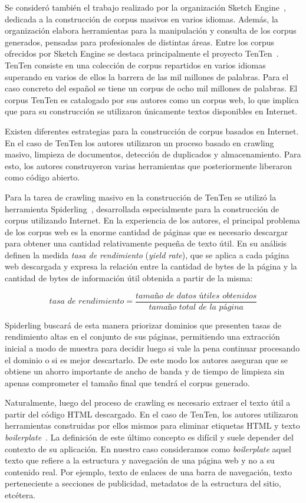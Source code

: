 Se consideró también el trabajo realizado por la organización Sketch Engine~\cite{SketchEngine}, dedicada
a la construcción de corpus masivos en varios idiomas. Además, la organización elabora herramientas para
la manipulación y consulta de los corpus generados, pensadas para profesionales de distintas áreas.
Entre los corpus ofrecidos por Sketch Engine se destaca principalmente el proyecto TenTen~\cite{TenTen}.
TenTen consiste en una colección de corpus repartidos en varios idiomas superando en varios de ellos
la barrera de las mil millones de palabras. Para el caso concreto del español se tiene un corpus de
ocho mil millones de palabras. El corpus TenTen es catalogado por sus autores como un corpus web, lo
que implica que para su construcción se utilizaron únicamente textos disponibles en Internet.

Existen diferentes estrategias para la construcción de corpus basados en Internet. En el caso de TenTen
los autores utilizaron un proceso basado en crawling masivo, limpieza de documentos, detección de
duplicados y almacenamiento. Para esto, los autores construyeron varias herramientas que posteriormente
liberaron como código abierto.

Para la tarea de crawling masivo en la construcción de TenTen se utilizó la herramienta
Spiderling~\cite{Spiderling}, desarrollada especialmente para la construcción de corpus utilizando Internet.
En la experiencia de los autores, el principal problema de los corpus web es la enorme cantidad de páginas que
es necesario descargar para obtener una cantidad relativamente pequeña de texto útil. En su análisis definen la
medida \textit{tasa de rendimiento} (\textit{yield rate}), que se aplica a cada página web descargada y
expresa la relación entre la cantidad de bytes de la página y la cantidad de bytes de información útil
obtenida a partir de la misma:

\[
  \textit{tasa de rendimiento} = \frac{\textit{tamaño de datos útiles obtenidos}}{\textit{tamaño total de la página}}
\]

Spiderling buscará de esta manera priorizar dominios que presenten tasas de rendimiento altas en el
conjunto de sus páginas, permitiendo una extracción inicial a modo de muestra para decidir luego si
vale la pena continuar procesando el dominio o si es mejor descartarlo. De este modo los autores aseguran
que se obtiene un ahorro importante de ancho de banda y de tiempo de limpieza sin apenas comprometer
el tamaño final que tendrá el corpus generado.

Naturalmente, luego del proceso de crawling es necesario extraer el texto útil a partir del código
HTML descargado. En el caso de TenTen, los autores utilizaron herramientas construidas por ellos mismos
para eliminar etiquetas HTML y texto \textit{boilerplate}~\cite{BoilerplateWebCorpora}. La definición de este
último concepto es difícil y suele depender del contexto de su aplicación. En nuestro caso consideramos como
\textit{boilerplate} aquel texto que refiere a la estructura y navegación de una página web y no a su
contenido real. Por ejemplo, texto de enlaces de una barra de navegación, texto perteneciente a secciones
de publicidad, metadatos de la estructura del sitio, etcétera.


